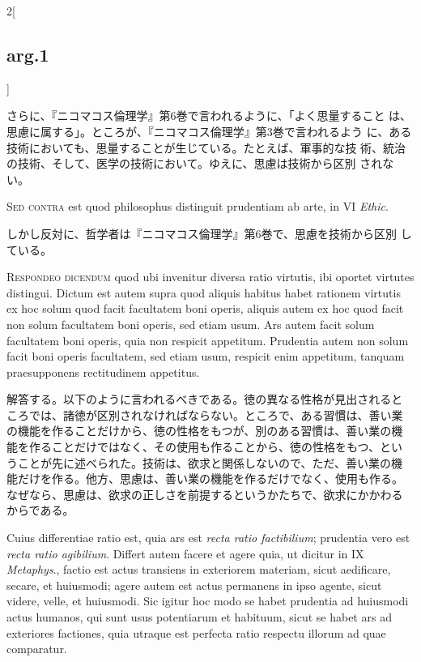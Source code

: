 \documentclass[paper=a4paper,fontsize=10pt,jafontsize=9pt,titlepage]{jlreq}
\begin{document}
\begin{paracol}{2}[\subsection{arg.1}]
\switchcolumn

さらに、『ニコマコス倫理学』第6巻で言われるように、「よく思量すること
は、思慮に属する」。ところが、『ニコマコス倫理学』第3巻で言われるよう
に、ある技術においても、思量することが生じている。たとえば、軍事的な技
術、統治の技術、そして、医学の技術において。ゆえに、思慮は技術から区別
されない。

\switchcolumn*[\subsection{s.c.}]

{\scshape Sed contra} est quod philosophus distinguit prudentiam ab
 arte, in VI {\itshape Ethic}.

\switchcolumn

しかし反対に、哲学者は『ニコマコス倫理学』第6巻で、思慮を技術から区別
している。


{\scshape Respondeo dicendum} quod ubi invenitur diversa ratio
virtutis, ibi oportet virtutes distingui. Dictum est autem supra quod
aliquis habitus habet rationem virtutis ex hoc solum quod facit
facultatem boni operis, aliquis autem ex hoc quod facit non solum
facultatem boni operis, sed etiam usum. Ars autem facit solum
facultatem boni operis, quia non respicit appetitum. Prudentia autem
non solum facit boni operis facultatem, sed etiam usum, respicit enim
appetitum, tanquam praesupponens rectitudinem appetitus.

\switchcolumn

解答する。以下のように言われるべきである。徳の異なる性格が見出されると
ころでは、諸徳が区別されなければならない。ところで、ある習慣は、善い業
の機能を作ることだけから、徳の性格をもつが、別のある習慣は、善い業の機
能を作ることだけではなく、その使用も作ることから、徳の性格をもつ、とい
うことが先に述べられた。技術は、欲求と関係しないので、ただ、善い業の機
能だけを作る。他方、思慮は、善い業の機能を作るだけでなく、使用も作る。
なぜなら、思慮は、欲求の正しさを前提するというかたちで、欲求にかかわる
からである。

\switchcolumn*

Cuius differentiae ratio est, quia ars est {\itshape recta ratio
factibilium}; prudentia vero est {\itshape recta ratio
agibilium}. Differt autem facere et agere quia, ut dicitur in IX
{\itshape Metaphys}., factio est actus transiens in exteriorem
materiam, sicut aedificare, secare, et huiusmodi; agere autem est
actus permanens in ipso agente, sicut videre, velle, et huiusmodi. Sic
igitur hoc modo se habet prudentia ad huiusmodi actus humanos, qui
sunt usus potentiarum et habituum, sicut se habet ars ad exteriores
factiones, quia utraque est perfecta ratio respectu illorum ad quae
comparatur.


\end{paracol}
\end{document}
